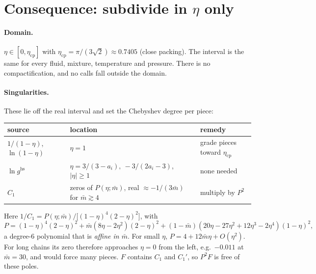 \documentclass[11pt]{article}
\newcommand{\etacp}{\eta_{\mathrm{cp}}}
\newcommand{\mbar}{\bar m}
\begin{document}
\section{Consequence: subdivide in $\eta$ only}

\paragraph{Domain.} $\eta\in[0,\etacp]$ with $\etacp = \pi/(3\sqrt2) \approx 0.7405$ (close
packing). The interval is the same for every fluid, mixture, temperature and pressure. There
is no compactification, and no calls fall outside the domain.

\paragraph{Singularities.} These lie off the real interval and set the Chebyshev degree per piece:
\begin{center}
\begin{tabular}{@{}lll@{}}
\toprule
source & location & remedy \\
\midrule
$1/(1-\eta)$, $\ln(1-\eta)$ & $\eta = 1$ & grade pieces toward $\etacp$ \\
$\ln g^{\mathrm{hs}}$ & $\eta = 3/(3-a_i),\ -3/(2a_i-3)$, $|\eta|\ge1$ & none needed \\
$C_1$ & zeros of $P(\eta;\mbar)$, real $\approx -1/(3\mbar)$ for $\mbar \gtrsim 4$ & multiply by $P^2$ \\
\bottomrule
\end{tabular}
\end{center}
Here $1/C_1 = P(\eta;\mbar)/\bigl[(1-\eta)^4(2-\eta)^2\bigr]$, with
\begin{equation}
P = (1-\eta)^4(2-\eta)^2 + \mbar(8\eta-2\eta^2)(2-\eta)^2 + (1-\mbar)(20\eta-27\eta^2+12\eta^3-2\eta^4)(1-\eta)^2,
\end{equation}
a degree-6 polynomial that is \emph{affine in $\mbar$}. For small $\eta$,
$P = 4 + 12\mbar\eta + O(\eta^2)$. For long chains its zero therefore approaches $\eta=0$ from
the left, e.g.\ $-0.011$ at $\mbar = 30$, and would force many pieces. $F$ contains $C_1$ and
$C_1'$, so $P^2F$ is free of these poles.
\end{document}
